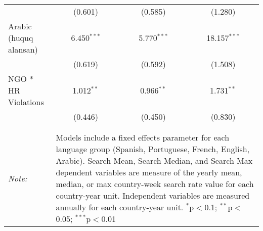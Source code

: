 \begin{table}[!htbp]
\begin{tabular}{@{\extracolsep{5pt}}lccc}
  & (0.601) & (0.585) & (1.280) \\ 
  Arabic (huquq alansan) & 6.450$^{***}$ & 5.770$^{***}$ & 18.157$^{***}$ \\ 
  & (0.619) & (0.592) & (1.508) \\ 
  NGO * HR Violations & 1.012$^{**}$ & 0.966$^{**}$ & 1.731$^{**}$ \\ 
  & (0.446) & (0.450) & (0.830) \\ 
 \hline \\[-1.8ex] 
\hline 
\hline \\[-1.8ex] 
\textit{Note:}  & \multicolumn{3}{l}{\parbox[t]{8cm}{Models include a fixed effects parameter for each language group (Spanish, Portuguese, French, English, Arabic). Search Mean, Search Median, and Search Max dependent variables are measure of the yearly mean, median, or max country-week search rate value for each country-year unit. Independent variables are measured annually for each country-year unit. $^{*}$p$<$0.1; $^{**}$p$<$0.05; $^{***}$p$<$0.01}} \\ 
\end{tabular} 
\end{table} 
